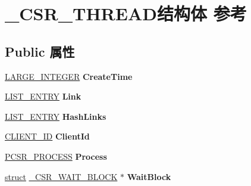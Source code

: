 \hypertarget{struct___c_s_r___t_h_r_e_a_d}{}\section{\+\_\+\+C\+S\+R\+\_\+\+T\+H\+R\+E\+A\+D结构体 参考}
\label{struct___c_s_r___t_h_r_e_a_d}
\subsection*{Public 属性}
\begin{DoxyCompactItemize}
\item 
\mbox{\label{struct___c_s_r___t_h_r_e_a_d_a10ccc8e4edf18a5d6d55af290370ce10}} 
\hyperlink{union___l_a_r_g_e___i_n_t_e_g_e_r}{L\+A\+R\+G\+E\+\_\+\+I\+N\+T\+E\+G\+ER} {\bfseries Create\+Time}
\item 
\mbox{\label{struct___c_s_r___t_h_r_e_a_d_a90561cb7855a1132f403c75d8b712159}} 
\hyperlink{struct___l_i_s_t___e_n_t_r_y}{L\+I\+S\+T\+\_\+\+E\+N\+T\+RY} {\bfseries Link}
\item 
\mbox{\label{struct___c_s_r___t_h_r_e_a_d_a269cd79c1ce94ac99f7d4edf324ad246}} 
\hyperlink{struct___l_i_s_t___e_n_t_r_y}{L\+I\+S\+T\+\_\+\+E\+N\+T\+RY} {\bfseries Hash\+Links}
\item 
\mbox{\label{struct___c_s_r___t_h_r_e_a_d_a6c90460344be32763c02d018bfa14df4}} 
\hyperlink{struct___c_l_i_e_n_t___i_d}{C\+L\+I\+E\+N\+T\+\_\+\+ID} {\bfseries Client\+Id}
\item 
\mbox{\label{struct___c_s_r___t_h_r_e_a_d_adac1282942a08d3fc7723024e68bd55b}} 
\hyperlink{struct___c_s_r___p_r_o_c_e_s_s}{P\+C\+S\+R\+\_\+\+P\+R\+O\+C\+E\+SS} {\bfseries Process}
\item 
\mbox{\label{struct___c_s_r___t_h_r_e_a_d_a21132b924bea6c0834c2dd6f5d152c46}} 
\hyperlink{interfacestruct}{struct} \hyperlink{struct___c_s_r___w_a_i_t___b_l_o_c_k}{\+\_\+\+C\+S\+R\+\_\+\+W\+A\+I\+T\+\_\+\+B\+L\+O\+CK} $\ast$ {\bfseries Wait\+Block}
\item 
\mbox{\label{struct___c_s_r___t_h_r_e_a_d_a2e26bc5a752eed25f0b8b7a0754edee1}} 

\end{DoxyCompactItemize}
